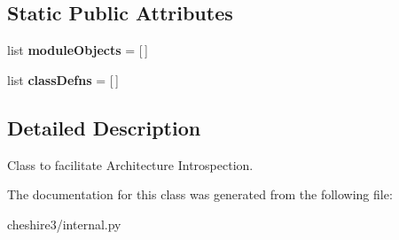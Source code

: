 \subsection*{Static Public Attributes}
\begin{DoxyCompactItemize}
\item 
\hypertarget{classcheshire3_1_1internal_1_1_architecture_a86075e5b95934dc29eb8032b958ecebc}{list {\bfseries module\-Objects} = \mbox{[}$\,$\mbox{]}}\label{classcheshire3_1_1internal_1_1_architecture_a86075e5b95934dc29eb8032b958ecebc}

\item 
\hypertarget{classcheshire3_1_1internal_1_1_architecture_a73bb8ae5446169864035a68bf586a482}{list {\bfseries class\-Defns} = \mbox{[}$\,$\mbox{]}}\label{classcheshire3_1_1internal_1_1_architecture_a73bb8ae5446169864035a68bf586a482}

\end{DoxyCompactItemize}


\subsection{Detailed Description}
\begin{DoxyVerb}Class to facilitate Architecture Introspection.\end{DoxyVerb}
 

The documentation for this class was generated from the following file\-:\begin{DoxyCompactItemize}
\item 
cheshire3/internal.\-py\end{DoxyCompactItemize}
